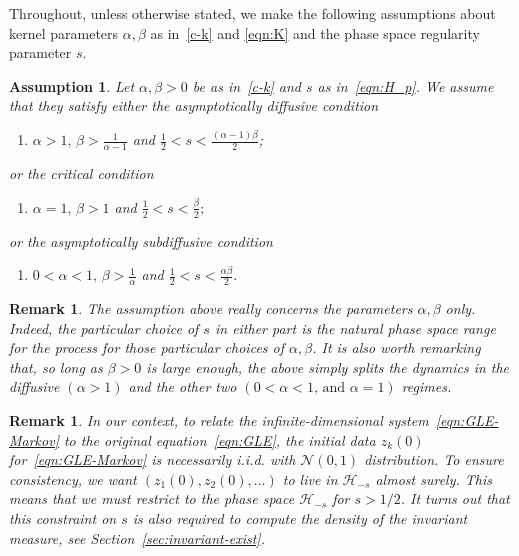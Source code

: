 \documentclass[11pt]{amsart}
\theoremstyle{definition}
\renewcommand{\H}{\mathcal{H}}
\theoremstyle{definition}
\theoremstyle{plain}
\newtheorem{assumption}[theorem]{Assumption}
\newtheorem{remark}[theorem]{Remark}
\numberwithin{equation}{section}
\begin{document}
Throughout, unless otherwise stated, we make the following assumptions about kernel parameters $\alpha, \beta$ as in~\eqref{c-k} and \eqref{eqn:K} and the phase space regularity parameter $s$.  
\begin{assumption}\label{cond:sol'n} Let $\alpha,\beta>0$ be as in~\eqref{c-k} and $s$ as in~\eqref{eqn:H_p}. We assume that they satisfy either the \emph{asymptotically diffusive} condition  
\begin{enumerate}
\item[\emph{(D)}]\label{cond:diffusion} $\displaystyle \alpha>1,\, \beta>\frac{1}{\alpha-1}$ and $\displaystyle \frac{1}{2}< s < \frac{(\alpha-1)\beta}{2}$;
\end{enumerate}  or the \emph{critical} condition
\begin{enumerate}
\item[\emph{(C)}] $\displaystyle \alpha =1,\, \beta>1$ and $\displaystyle \frac{1}{2}< s< \frac{ \beta}{2};$
\end{enumerate}
or the \emph{asymptotically subdiffusive} condition 
\begin{enumerate}
\item[\emph{(SD)}]\label{cond:subdiffusion} $\displaystyle 0<\alpha <1,\, \beta>\frac{
1}{\alpha}$ and $\displaystyle \frac{1}{2}< s< \frac{\alpha \beta}{2}.$
\end{enumerate}
\end{assumption} 
\begin{remark} 
The assumption above really concerns the parameters $\alpha, \beta$ only.  Indeed, the particular choice of $s$ in either part is the natural phase space range for the process for those particular choices of $\alpha, \beta$.  It is also worth remarking that, so long as $\beta>0$ is large enough, the above simply splits the dynamics in the diffusive $(\alpha >1)$ and the other two $(0<\alpha<1,\,\text{and}\,\, \alpha=1)$ regimes.  
\end{remark}

\begin{remark} In our context, to relate the infinite-dimensional system~\eqref{eqn:GLE-Markov} to the original equation~\eqref{eqn:GLE}, the initial data $z_k(0)$ for~\eqref{eqn:GLE-Markov} is necessarily i.i.d. with $\mathcal{N}(0,1)$ distribution. To ensure consistency, we want $(z_1(0),z_2(0),\dots)$ to live in $\H_{-s}$ almost surely. This means that we must restrict to the phase space $\H_{-s}$ for $s>1/2$. It turns out that this constraint on $s$ is also required to compute the density of the invariant measure, see Section~\ref{sec:invariant-exist}.
\end{remark} 
\end{document}
